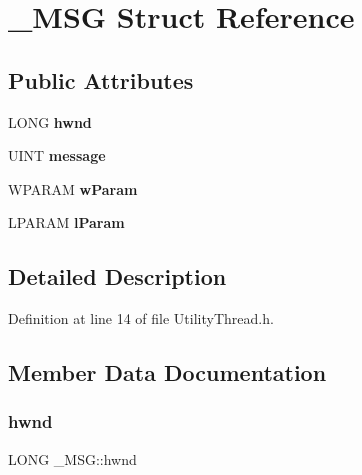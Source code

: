 \hypertarget{struct___m_s_g}{}\section{\+\_\+\+M\+SG Struct Reference}
\label{struct___m_s_g}
\subsection*{Public Attributes}
\begin{DoxyCompactItemize}
\item 
\mbox{\label{struct___m_s_g_ab70a69a1c8b4ca6bcce2a3bcef828474}} 
L\+O\+NG {\bfseries hwnd}
\item 
\mbox{\label{struct___m_s_g_ab90fa5e1cafdc0a1dc6bec0a731bf10f}} 
U\+I\+NT {\bfseries message}
\item 
\mbox{\label{struct___m_s_g_a167c251f555f1752dad816e567ec8c78}} 
W\+P\+A\+R\+AM {\bfseries w\+Param}
\item 
\mbox{\label{struct___m_s_g_a9537c524889d8c2e93f750f97e4f985b}} 
L\+P\+A\+R\+AM {\bfseries l\+Param}
\end{DoxyCompactItemize}


\subsection{Detailed Description}


Definition at line 14 of file Utility\+Thread.\+h.



\subsection{Member Data Documentation}
\mbox{\label{struct___m_s_g_ab70a69a1c8b4ca6bcce2a3bcef828474}} 
\subsubsection{\texorpdfstring{hwnd}{hwnd}}
{\footnotesize\ttfamily L\+O\+NG \+\_\+\+M\+S\+G\+::hwnd}



